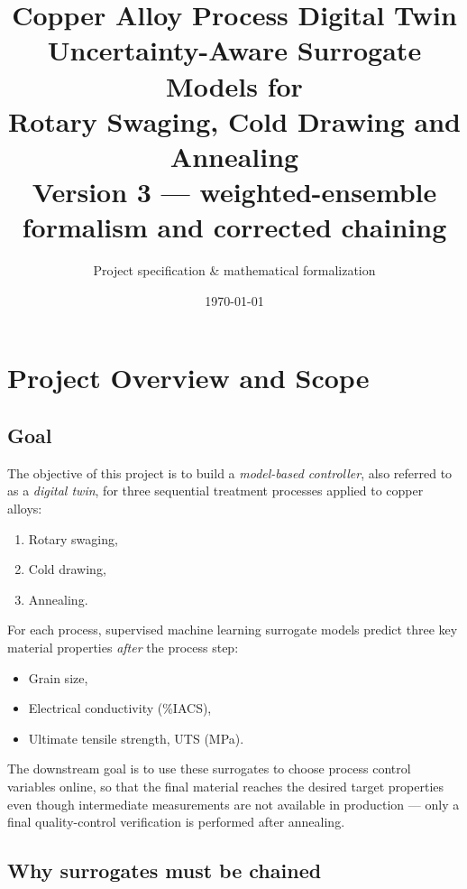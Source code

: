 \documentclass[11pt,a4paper]{article}
\title{\textbf{Copper Alloy Process Digital Twin}\\[0.4em]
\large Uncertainty-Aware Surrogate Models for\\Rotary Swaging, Cold Drawing and Annealing\\[0.4em]
\normalsize Version 3 --- weighted-ensemble formalism and corrected chaining}
\author{Project specification \& mathematical formalization}
\date{\today}
\begin{document}
\maketitle
\tableofcontents
\bigskip

\section{Project Overview and Scope}
\label{sec:overview}

\subsection{Goal}

The objective of this project is to build a \emph{model-based controller}, also referred to as a \emph{digital twin}, for three sequential treatment processes applied to copper alloys:
\begin{enumerate}
    \item Rotary swaging,
    \item Cold drawing,
    \item Annealing.
\end{enumerate}
For each process, supervised machine learning surrogate models predict three key material properties \emph{after} the process step:
\begin{itemize}
    \item Grain size,
    \item Electrical conductivity (\%IACS),
    \item Ultimate tensile strength, UTS (MPa).
\end{itemize}

The downstream goal is to use these surrogates to choose process control variables online, so that the final material reaches the desired target properties even though intermediate measurements are not available in production --- only a final quality-control verification is performed after annealing.

\subsection{Why surrogates must be chained}
\end{document}
